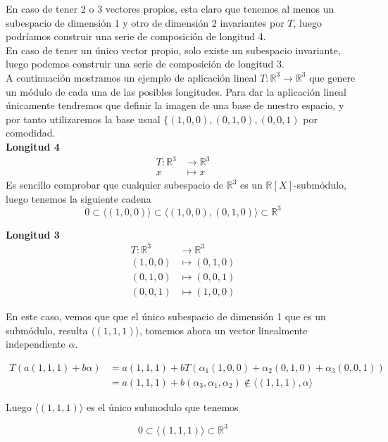 En caso de tener \(2\) o \(3\) vectores propios, esta claro que tenemos al menos
un subespacio de dimensión \(1\) y otro de dimensión \(2\) invariantes por
\(T\), luego podríamos construir una serie de composición de longitud 4.\\

En caso de tener un único vector propio, solo existe un subespacio invariante,
luego podemos construir una serie de composición de longitud 3.\\


A continuación mostramos un ejemplo de aplicación lineal \(T:\mathbb{R}^3 \rightarrow \mathbb{R}^3\) que genere un módulo de cada una de las posibles longitudes.
Para dar la aplicación lineal únicamente tendremos que definir la imagen de una base de nuestro espacio, y por tanto utilizaremos la base usual
\(\{(1,0,0), (0,1,0), (0,0,1)\) por comodidad.\\

\textbf{Longitud 4}%
\[
\begin{aligned}
  T:\mathbb{R}^3 &\rightarrow \mathbb{R}^3\\
  x &\mapsto x
\end{aligned}
\]
Es sencillo comprobar que cualquier subespacio de \(\mathbb{R}^3\) es un
\(\mathbb{R}[X]\)-submódulo, luego tenemos la siguiente cadena
\[
        0 \subset \langle (1,0,0) \rangle \subset \langle (1,0,0), (0,1,0)
        \rangle \subset \mathbb{R}^3
\]

\textbf{Longitud 3}%
\[
\begin{aligned}
  T:\mathbb{R}^3 &\rightarrow \mathbb{R}^3\\
  (1,0,0) &\mapsto (0,1,0)\\
  (0,1,0) &\mapsto (0,0,1)\\
  (0,0,1) &\mapsto (1,0,0)
\end{aligned}
\]

En este caso, vemos que que el único subespacio de dimensión 1 que es un
submódulo, resulta \(\langle (1,1,1) \rangle\), tomemos ahora un vector
linealmente independiente \(\alpha\).

\[
  \begin{aligned}
  T(a(1,1,1) + b\alpha) &= a(1,1,1) + bT(\alpha_1(1,0,0) + \alpha_2(0,1,0) +
  \alpha_3(0,0,1))\\
  &= a(1,1,1) + b(\alpha_3, \alpha_1, \alpha_2) \not \in
  \langle(1,1,1),\alpha\rangle
  \end{aligned}
\]

Luego \(\langle (1,1,1)\rangle\) es el único submodulo que tenemos

\[
        0 \subset \langle (1,1,1) \rangle \subset \mathbb{R}^3
\]
